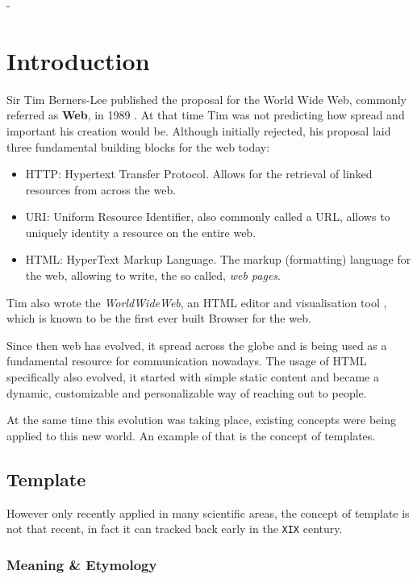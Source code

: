 -\chapter{Introduction}

Sir Tim Berners-Lee published the proposal for the World Wide Web, commonly referred as \textbf{Web}, in 1989 \cite{Berners-Lee1989InformationProposal}. At that time Tim was not predicting how spread and important his creation would be. Although initially rejected, his proposal laid three fundamental building blocks for the web today:

\begin{itemize}
    \item HTTP: Hypertext Transfer Protocol. Allows for the retrieval of linked resources from across the web.
    \item URI: Uniform Resource Identifier, also commonly called a URL, allows to uniquely identity a resource on the entire web.
    \item HTML: HyperText Markup Language. The markup (formatting) language for the web, allowing to write, the so called, \textit{web pages}.
\end{itemize}

Tim also wrote the \textit{WorldWideWeb}, an HTML editor and visualisation tool \cite{Gillies2000HowWeb}, which is known to be the first ever built Browser for the web.

Since then web has evolved, it spread across the globe and is being used as a fundamental resource for communication nowadays. The usage of HTML specifically also evolved, it started with simple static content and became a dynamic, customizable and personalizable way of reaching out to people.

At the same time this evolution was taking place, existing concepts were being applied to this new world. An example of that is the concept of templates.

\section{Template}

However only recently applied in many scientific areas, the concept of template is not that recent, in fact it can tracked back early in the \texttt{XIX} century.

\subsection{Meaning \& Etymology}

